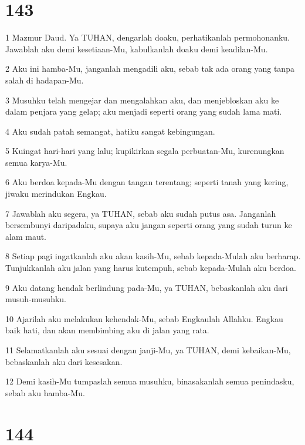 \chapter{143}

\par 1 Mazmur Daud. Ya TUHAN, dengarlah doaku, perhatikanlah permohonanku. Jawablah aku demi kesetiaan-Mu, kabulkanlah doaku demi keadilan-Mu.
\par 2 Aku ini hamba-Mu, janganlah mengadili aku, sebab tak ada orang yang tanpa salah di hadapan-Mu.
\par 3 Musuhku telah mengejar dan mengalahkan aku, dan menjebloskan aku ke dalam penjara yang gelap; aku menjadi seperti orang yang sudah lama mati.
\par 4 Aku sudah patah semangat, hatiku sangat kebingungan.
\par 5 Kuingat hari-hari yang lalu; kupikirkan segala perbuatan-Mu, kurenungkan semua karya-Mu.
\par 6 Aku berdoa kepada-Mu dengan tangan terentang; seperti tanah yang kering, jiwaku merindukan Engkau.
\par 7 Jawablah aku segera, ya TUHAN, sebab aku sudah putus asa. Janganlah bersembunyi daripadaku, supaya aku jangan seperti orang yang sudah turun ke alam maut.
\par 8 Setiap pagi ingatkanlah aku akan kasih-Mu, sebab kepada-Mulah aku berharap. Tunjukkanlah aku jalan yang harus kutempuh, sebab kepada-Mulah aku berdoa.
\par 9 Aku datang hendak berlindung pada-Mu, ya TUHAN, bebaskanlah aku dari musuh-musuhku.
\par 10 Ajarilah aku melakukan kehendak-Mu, sebab Engkaulah Allahku. Engkau baik hati, dan akan membimbing aku di jalan yang rata.
\par 11 Selamatkanlah aku sesuai dengan janji-Mu, ya TUHAN, demi kebaikan-Mu, bebaskanlah aku dari kesesakan.
\par 12 Demi kasih-Mu tumpaslah semua musuhku, binasakanlah semua penindasku, sebab aku hamba-Mu.

\chapter{144}

